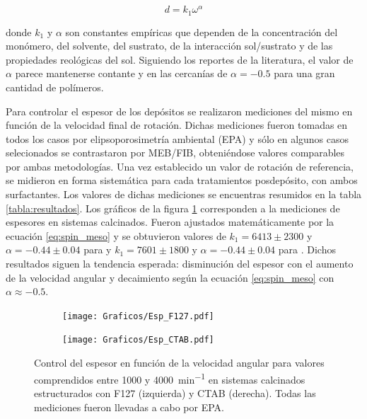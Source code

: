 			\begin{equation}
			  d = k_1 \omega^{\alpha}
			  \label{eq:spin_meso}
			  \end{equation}		
	
		\noindent donde $k_1$ y $\alpha$ son constantes empíricas que dependen de la concentración del monómero, del solvente, del sustrato, de la interacción sol/sustrato y  de las propiedades reológicas del sol. Siguiendo los reportes de la literatura, el valor de $\alpha$ parece mantenerse contante y en las cercanías de $\alpha=-0.5$ para una gran cantidad de polímeros.\cite{Meyerhofer1978,Bornside1989,Lora1990}

		Para controlar el espesor de los depósitos se realizaron mediciones del mismo en función de la velocidad final de rotación.  Dichas mediciones fueron tomadas en todos los casos por elipsoporosimetría ambiental (EPA) y sólo en algunos casos selecionados se contrastaron por MEB/FIB, obteniéndose valores comparables por ambas metodologías. Una vez establecido un valor de rotación de referencia, se midieron en forma sistemática para cada tratamientos posdepósito, con ambos surfactantes. Los valores de dichas mediciones se encuentras resumidos en la tabla \ref{tabla:resultados}.
		Los gráficos de la figura \ref{fig:esp} corresponden a la mediciones de espesores en sistemas calcinados. Fueron ajustados matemáticamente por la ecuación \ref{eq:spin_meso} y se obtuvieron valores de $k_1=6413\pm 2300$ y $\alpha=-0.44 \pm 0.04$ para \pdmF\space y $k_1=7601\pm 1800$ y $\alpha=-0.44 \pm 0.04$ para \pdmC. Dichos resultados siguen la tendencia esperada: disminución del espesor con el aumento de la velocidad angular y decaimiento según la ecuación \ref{eq:spin_meso} con $\alpha \approx -0.5$. 

		
			\begin{figure}[!ht]
				\begin{subfigure}[t]{0.495\textwidth}
				\texttt{[image: Graficos/Esp\_F127.pdf]}
				\end{subfigure}
				\begin{subfigure}[t]{0.495\textwidth}
				\texttt{[image: Graficos/Esp\_CTAB.pdf]}
				\end{subfigure}
				\caption[Espesor en función de la velocidad angular]{Control del espesor en función de la velocidad angular para valores comprendidos entre 1000 y \SI{4000}{\minute^{-1}} en sistemas calcinados estructurados con F127 (izquierda) y CTAB (derecha). Todas las mediciones fueron llevadas a cabo por EPA.}
				\label{fig:esp}		
				\end{figure}
	
